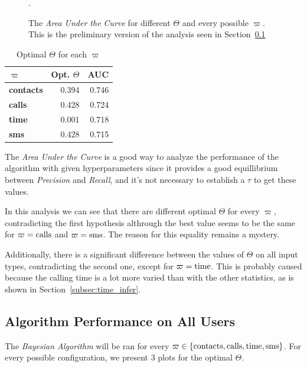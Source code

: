 \begin{figure}
\centering
{}
\caption{The \emph{Area Under the Curve} for different $\Theta$ and every possible $\varpi$. This is the preliminary version of the analysis seen in Section~\ref{subsec:algorithm_performance}}.
\label{fig:theta}
\end{figure}

\setlength{\tabcolsep}{3pt}
\begin{table}
\centering
\begin{tabular}{>{\bfseries}l r r}
	\toprule
	$\varpi$ & Opt. $\Theta$ & AUC \\
	\midrule
	contacts & \num{0.394} & \num{0.746} \\
	calls & \num{0.428} & \num{0.724} \\
	time & \num{0.001} & \num{0.718} \\
	sms & \num{0.428} & \num{0.715} \\
	\bottomrule
\end{tabular}
\caption{Optimal $\Theta$ for each $\varpi$}
\label{tab:besttheta}
\end{table}

The \emph{Area Under the Curve} is a good way to analyze the performance of the algorithm with given hyperparameters since it provides a good equillibrium between \emph{Precision} and \emph{Recall}, and it's not necessary to establish a $\tau$ to get these values.

In this analysis we can see that there are different optimal $\Theta$ for every $\varpi$, contradicting the first hypothesis althrough the best value seems to be the same for $\varpi = \operatorname{calls}$ and $\varpi = \operatorname{sms}$. The reason for this equality remains a mystery.

Additionally, there is a significant difference between the values of $\Theta$ on all input types, contradicting the second one, except for $\varpi = \operatorname{time}$. This is probably caused because the calling time is a lot more varied than with the other statistics, as is shown in Section~\ref{subsec:time_infer}.

\subsection{Algorithm Performance on All Users}
\label{subsec:algorithm_performance}

The \emph{Bayesian Algorithm} will be ran for every $\varpi \in \left\{ \operatorname{contacts}, \operatorname{calls}, \operatorname{time}, \operatorname{sms} \right\}$. For every possible configuration, we present 3 plots for the optimal $\Theta$.

